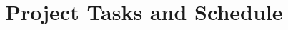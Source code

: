 \documentclass[../../projectPlan.tex]{subfiles}
\begin{document}
	\chapter{Project Tasks and Schedule}		

		
\end{document}
